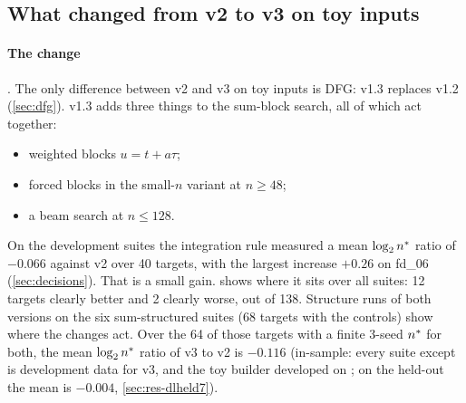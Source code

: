 \subsection{What changed from v2 to v3 on toy inputs}\label{app:further-v2v3}\label{sec:res-v2v3}

\begin{table}[t]
\centering{\footnotesize
}
\caption{Every toy target on which v3's $\nstar$ differs clearly from v2's ($|\log_2\text{ratio}|>0.25$), on all suites with results for both . There are 14 such targets among the 138. None is on  or on the held-out . Source: .}
\label{tab:toy-v2v3}
\end{table}

\paragraph{The change} . The only difference between v2 and v3 on toy inputs is DFG: v1.3 replaces v1.2 (\cref{sec:dfg}). v1.3 adds three things to the sum-block search, all of which act together:
\begin{itemize}
\item weighted blocks $u=t+a\tau$;
\item forced blocks in the small-$n$ variant at $n\ge48$;
\item a beam search at $n\le128$.
\end{itemize}
On the development suites the integration rule measured a mean $\log_2n^{*}$ ratio of $-0.066$ against v2 over 40 targets, with the largest increase $+0.26$ on fd\_06 (\cref{sec:decisions}). That is a small gain.  shows where it sits over all suites: 12 targets clearly better and 2 clearly worse, out of 138. Structure runs of both versions on the six sum-structured suites (68 targets with the controls) show where the changes act. Over the 64 of those targets with a finite 3-seed $\nstar$ for both, the mean $\log_2n^{*}$ ratio of v3 to v2 is $-0.116$ (in-sample: every suite except  is development data for v3, and the toy builder developed on ; on the held-out  the mean is $-0.004$, \cref{sec:res-dlheld7}).

